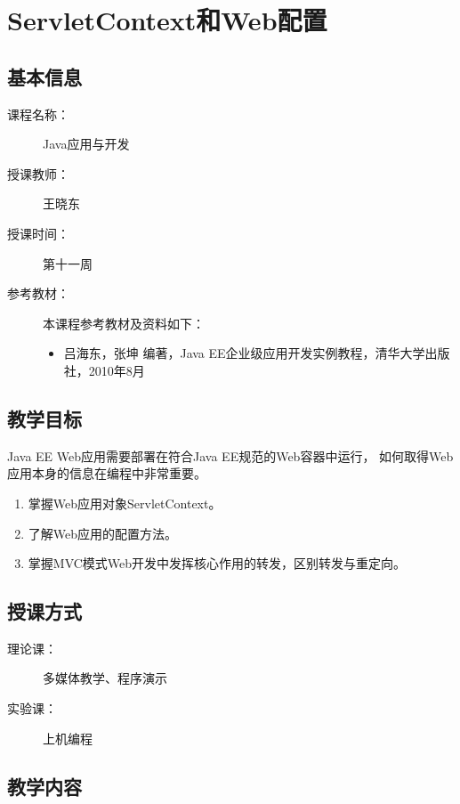 \chapter{ServletContext和Web配置}
\label{chp:JavaEE-ServletContext-and-Web-configuration}

\section*{基本信息}
\sline
\begin{description}
\item[课程名称：] Java应用与开发
\item[授课教师：] 王晓东
\item[授课时间：] 第十一周
\item[参考教材：] 本课程参考教材及资料如下：
  \begin{itemize}
  \item 吕海东，张坤 编著，Java EE企业级应用开发实例教程，清华大学出版社，2010年8月
  \end{itemize}
\end{description}

\section*{教学目标}

\sline

{\hei\Blue Java EE Web应用需要部署在符合Java EE规范的Web容器中运行，
  如何取得Web应用本身的信息在编程中非常重要。}

\begin{enumerate}
\item 掌握Web应用对象ServletContext。
\item 了解Web应用的配置方法。
\item 掌握MVC模式Web开发中发挥核心作用的转发，区别{\hei 转发}与{\hei 重定向}。
\end{enumerate}  

\section*{授课方式}

\sline
\begin{description}
\item[理论课：] 多媒体教学、程序演示
\item[实验课：] 上机编程
\end{description}

\newpage
\section*{教学内容}
\sline

